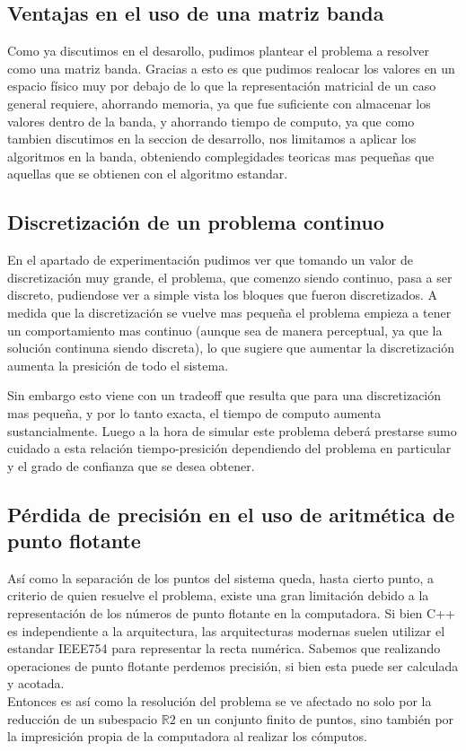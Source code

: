 \subsection{Ventajas en el uso de una matriz banda}

Como ya discutimos en el desarollo, pudimos plantear el problema a resolver como una matriz banda. Gracias a esto es que pudimos realocar los valores en un espacio f\'isico muy por debajo de lo que la representaci\'on matricial de un caso general requiere, ahorrando memoria, ya que fue suficiente con almacenar los valores dentro de la banda, y ahorrando tiempo de computo, ya que como tambien discutimos en la seccion de desarrollo, nos limitamos a aplicar los algoritmos en la banda, obteniendo complegidades teoricas mas pequeñas que aquellas que se obtienen con el algoritmo estandar.

\subsection{Discretizaci\'on de un problema continuo}

En el apartado de experimentación pudimos ver que tomando un valor de discretización muy grande, el problema, que comenzo siendo continuo, pasa a ser discreto, pudiendose ver a simple vista los bloques que fueron discretizados. A medida que la discretización se vuelve mas pequeña el problema empieza a tener un comportamiento mas continuo (aunque sea de manera perceptual, ya que la solución continuna siendo discreta), lo que sugiere que aumentar la discretización aumenta la presición de todo el sistema.

Sin embargo esto viene con un tradeoff que resulta que para una discretización mas pequeña, y por lo tanto exacta, el tiempo de computo aumenta sustancialmente. Luego a la hora de simular este problema deberá prestarse sumo cuidado a esta relación tiempo-presición dependiendo del problema en particular y el grado de confianza que se desea obtener.

\subsection{P\'erdida de precisi\'on en el uso de aritm\'etica de punto flotante}

As\'i como la separaci\'on de los puntos del sistema queda, hasta cierto punto, a criterio de quien resuelve el problema, existe una gran limitaci\'on debido	a la representaci\'on de los n\'umeros de punto flotante en la computadora. Si bien C++ es independiente a la arquitectura, las arquitecturas modernas suelen utilizar el estandar IEEE754 para representar la recta num\'erica. Sabemos que realizando operaciones de punto flotante perdemos precisi\'on, si bien esta puede ser calculada y acotada. 
\\
Entonces es as\'i como la resoluci\'on del problema se ve afectado no solo por la reducci\'on de un subespacio $\mathbb{R}2$ en un conjunto finito de puntos, sino tambi\'en por la impresici\'on propia de la computadora al realizar los c\'omputos.


